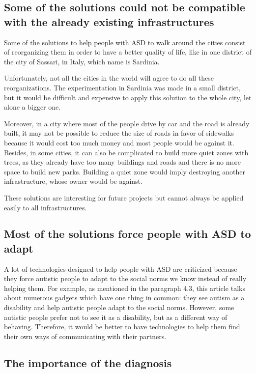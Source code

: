 \subsection{Some of the solutions could not be compatible with the already existing infrastructures}

Some of the solutions to help people with ASD to walk around the cities consist of reorganizing them in order to have a better quality of life, like in one district of the city of Sassari, in Italy, which name is Sardinia\cite{2018MobilityPoliciesExtraSmall}.

Unfortunately, not all the cities in the world will agree to do all these reorganizations. The experimentation in Sardinia was made in a small district, but it would be difficult and expensive to apply this solution to the whole city, let alone a bigger one.

Moreover, in a city where most of the people drive by car and the road is already built, it may not be possible to reduce the size of roads in favor of sidewalks because it would cost too much money and most people would be against it. Besides, in some cities, it can also be complicated to build more quiet zones with trees, as they already have too many buildings and roads and there is no more space to build new parks. Building a quiet zone would imply destroying another infrastructure, whose owner would be against. 

These solutions are interesting for future projects but cannot always be applied easily to all infrastructures.

\subsection{Most of the solutions force people with ASD to adapt}

A lot of technologies designed to help people with ASD are criticized because they force autistic people to adapt to the social norms we know instead of really helping them. For example, as mentioned in the paragraph 4.3, this article talks about numerous gadgets which have one thing in common: they see autism as a disability and help autistic people adapt to the social norms\cite{2017UTravelSmartMobility}. However, some autistic people prefer not to see it as a disability, but as a different way of behaving. Therefore, it would be better to have technologies to help them find their own ways of communicating with their partners. 

\subsection{The importance of the diagnosis}

